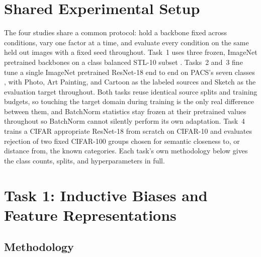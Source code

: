 \documentclass{article}
\begin{document}
\section{Shared Experimental Setup}
\label{sec:setup}

The four studies share a common protocol: hold a backbone fixed across
conditions, vary one factor at a time, and evaluate every condition on
the same held out images with a fixed seed throughout.
Task~1 uses three frozen, ImageNet pretrained backbones on a
class balanced STL-10 subset \citep{coates2011analysis}. Tasks~2 and~3
fine tune a single ImageNet pretrained ResNet-18 end to end on PACS's
seven classes \citep{li2017deeper}, with Photo, Art Painting, and Cartoon
as the labeled sources and Sketch as the evaluation target throughout. Both
tasks reuse identical source splits and training budgets, so touching the
target domain during training is the only real difference between them,
and BatchNorm statistics stay frozen at their pretrained values throughout
so BatchNorm cannot silently perform its own adaptation. Task~4 trains a
CIFAR appropriate ResNet-18 from scratch on
CIFAR-10 \citep{krizhevsky2009learning} and evaluates rejection of two
fixed CIFAR-100 groups chosen for semantic closeness to, or distance
from, the known categories. Each task's own methodology below gives the
class counts, splits, and hyperparameters in full.

\section{Task 1: Inductive Biases and Feature Representations}
\label{sec:task1}

\subsection{Methodology}
\end{document}
